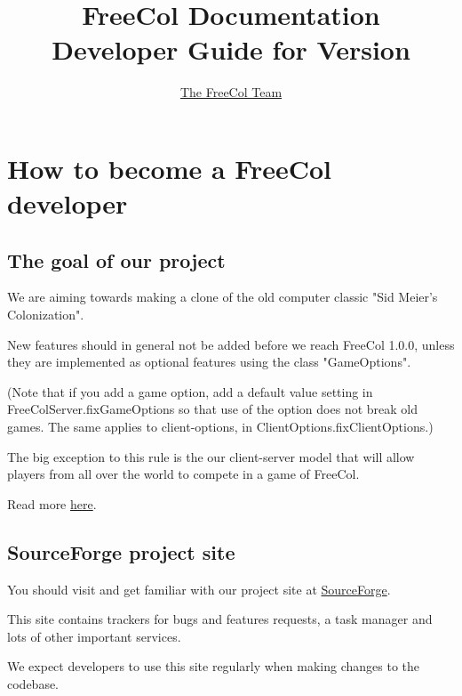 \documentclass[12pt]{book}
\begin{document}
\author{\href{http://www.freecol.org/team-and-credits.html}{The FreeCol Team}}
\title{FreeCol Documentation\\Developer Guide for Version \fcversion}
\maketitle{}

\tableofcontents
\newpage


\hypertarget{How to become a FreeCol developer}
            {\chapter{How to become a FreeCol developer}}


\hypertarget{The goal of our project}{\section{The goal of our project}}

We are aiming towards making a clone of the old computer
classic "Sid Meier's Colonization".

New features should in general not be added before we reach
FreeCol 1.0.0, unless they are implemented as optional features
using the class "GameOptions".

(Note that if you add a game option, add a default value setting in
FreeColServer.fixGameOptions so that use of the option does not break
old games.  The same applies to client-options,
in ClientOptions.fixClientOptions.)

The big exception to this rule is the our client-server model that
will allow players from all over the world to compete in a game
of FreeCol.

Read more \href{http://www.freecol.org/about.html}{here}.


\hypertarget{SourceForge project site}{\section{SourceForge project site}}

You should visit and get familiar with our project site at
\href{https://sourceforge.net/projects/freecol/}{SourceForge}.

This site contains trackers for bugs and features requests,
a task manager and lots of other important services.

We expect developers to use this site regularly when making
changes to the codebase.
\end{document}
